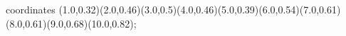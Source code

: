 					coordinates { (1.0,0.32)(2.0,0.46)(3.0,0.5)(4.0,0.46)(5.0,0.39)(6.0,0.54)(7.0,0.61)(8.0,0.61)(9.0,0.68)(10.0,0.82)};